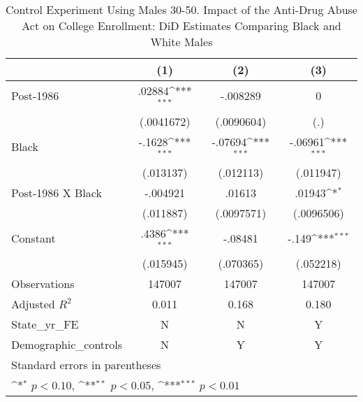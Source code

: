 \begin{table}[htbp]\centering
\def\sym#1{\ifmmode^{#1}\else\(^{#1}\)\fi}
\caption{Control Experiment Using Males 30-50. Impact of the Anti-Drug Abuse Act on College Enrollment: DiD Estimates Comparing Black and White Males}
\begin{tabular}{l*{3}{c}}
\hline\hline
                    &\multicolumn{1}{c}{(1)}         &\multicolumn{1}{c}{(2)}         &\multicolumn{1}{c}{(3)}         \\
\hline
Post-1986           &      .02884\sym{***}&    -.008289         &           0         \\
                    &  (.0041672)         &  (.0090604)         &         (.)         \\
[1em]
Black               &      -.1628\sym{***}&     -.07694\sym{***}&     -.06961\sym{***}\\
                    &   (.013137)         &   (.012113)         &   (.011947)         \\
[1em]
Post-1986 X Black   &    -.004921         &      .01613         &      .01943\sym{*}  \\
                    &   (.011887)         &  (.0097571)         &  (.0096506)         \\
[1em]
Constant            &       .4386\sym{***}&     -.08481         &       -.149\sym{***}\\
                    &   (.015945)         &   (.070365)         &   (.052218)         \\
\hline
Observations        &      147007         &      147007         &      147007         \\
Adjusted \(R^{2}\)  &       0.011         &       0.168         &       0.180         \\
State\_yr\_FE         &           N         &           N         &           Y         \\
Demographic\_controls&           N         &           Y         &           Y         \\
\hline\hline
\multicolumn{4}{l}{\footnotesize Standard errors in parentheses}\\
\multicolumn{4}{l}{\footnotesize \sym{*} \(p<0.10\), \sym{**} \(p<0.05\), \sym{***} \(p<0.01\)}\\
\end{tabular}
\end{table}
